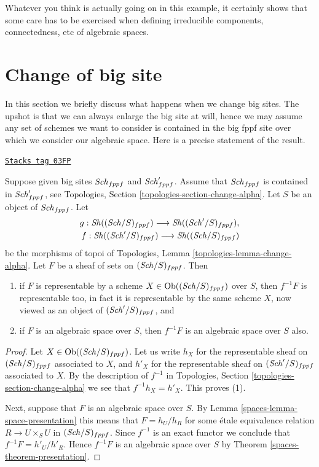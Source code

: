 Whatever you think is actually going on in this example, it certainly
shows that some care has to be exercised when defining irreducible
components, connectedness, etc of algebraic spaces.

\section{Change of big site}
\label{spaces-section-change-big-site}
In this section we briefly discuss what happens when we change big sites.
The upshot is that we can always enlarge the big site at will, hence we
may assume any set of schemes we want to consider is contained in the big
fppf site over which we consider our algebraic space. Here is a precise
statement of the result.

\begin{lemma}
\label{spaces-lemma-change-big-site}
\href{https://stacks.math.columbia.edu/tag/03FP}{\texttt{Stacks tag 03FP}}

Suppose given big sites $\mathit{Sch}_{fppf}$ and $\mathit{Sch}'_{fppf}$.
Assume that $\mathit{Sch}_{fppf}$ is contained in $\mathit{Sch}'_{fppf}$,
see Topologies, Section \ref{topologies-section-change-alpha}.
Let $S$ be an object of $\mathit{Sch}_{fppf}$. Let
\begin{align*}
g : \mathit{Sh}((\mathit{Sch}/S)_{fppf})
\longrightarrow
\mathit{Sh}((\mathit{Sch}'/S)_{fppf}), \\
f : \mathit{Sh}((\mathit{Sch}'/S)_{fppf})
\longrightarrow
\mathit{Sh}((\mathit{Sch}/S)_{fppf})
\end{align*}
be the morphisms of topoi of
Topologies, Lemma \ref{topologies-lemma-change-alpha}.
Let $F$ be a sheaf of sets on $(\mathit{Sch}/S)_{fppf}$. Then
\begin{enumerate}
\item if $F$ is representable by a scheme
$X \in \operatorname{Ob}((\mathit{Sch}/S)_{fppf})$ over $S$,
then $f^{-1}F$ is representable too, in fact it is representable by the
same scheme $X$, now viewed as an object of $(\mathit{Sch}'/S)_{fppf}$, and
\item if $F$ is an algebraic space over $S$, then $f^{-1}F$ is an algebraic
space over $S$ also.
\end{enumerate}
\end{lemma}

\begin{proof}

Let $X \in \operatorname{Ob}((\mathit{Sch}/S)_{fppf})$. Let us write $h_X$ for the
representable sheaf on $(\mathit{Sch}/S)_{fppf}$ associated to $X$, and
$h'_X$ for the representable sheaf on $(\mathit{Sch}'/S)_{fppf}$ associated to
$X$. By the description of $f^{-1}$ in
Topologies, Section \ref{topologies-section-change-alpha}
we see that $f^{-1}h_X = h'_X$. This proves (1).

\medskip\noindent
Next, suppose that $F$
is an algebraic space over $S$. By Lemma \ref{spaces-lemma-space-presentation}
this means that $F = h_U/h_R$ for some \'etale equivalence relation
$R \to U \times_S U$ in $(\mathit{Sch}/S)_{fppf}$. Since $f^{-1}$ is an
exact functor we conclude that $f^{-1}F = h'_U/h'_R$. Hence
$f^{-1}F$ is an algebraic space over $S$ by Theorem \ref{spaces-theorem-presentation}.
\end{proof}

